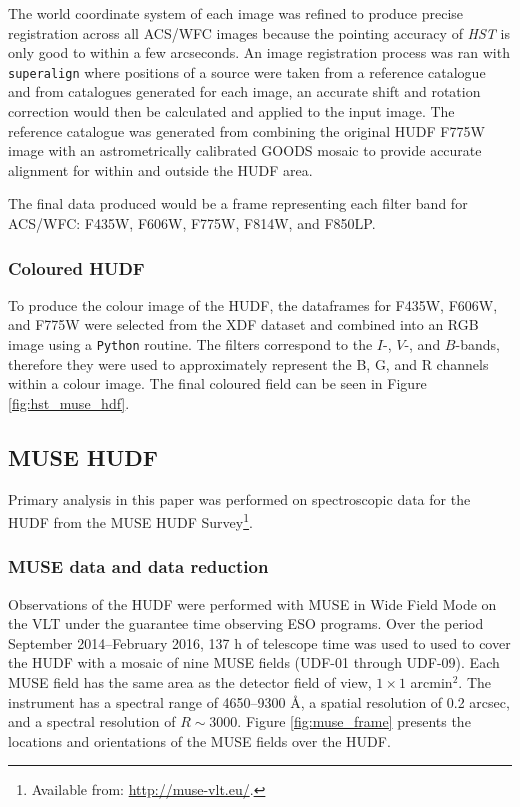 \documentclass[12pt, twocolumn, nofootinbib]{revtex4-1}    %
\begin{document}
The world coordinate system of each image was refined to produce precise registration across all ACS/WFC images because the pointing accuracy of \textit{HST} is only good to within a few arcseconds. An image registration process was ran with \texttt{superalign} \citep{2013ApJS..209....6I} where positions of a source were taken from a reference catalogue and from catalogues generated for each image, an accurate shift and rotation correction would then be calculated and applied to the input image. The reference catalogue was generated from combining the original HUDF F775W image with an astrometrically calibrated GOODS mosaic to provide accurate alignment for within and outside the HUDF area.

The final data produced would be a frame representing each filter band for ACS/WFC: F435W, F606W, F775W, F814W, and F850LP.

\vspace{2ex} %
\subsubsection{Coloured HUDF}
\noindent
To produce the colour image of the HUDF, the dataframes for F435W, F606W, and F775W were selected from the XDF dataset and combined into an RGB image using a \texttt{Python} routine. The filters correspond to the $I$-, $V$-, and $B$-bands, therefore they were used to approximately represent the B, G, and R channels within a colour image. The final coloured field can be seen in Figure \ref{fig:hst_muse_hdf}.

\vspace{2ex} %
\subsection{MUSE HUDF} \label{sec:obs_muse}
\noindent
Primary analysis in this paper was performed on spectroscopic data for the HUDF from the MUSE HUDF Survey\footnote{Available from: \href{http://muse-vlt.eu/}{http://muse-vlt.eu/}.}.

\vspace{2ex} %
\subsubsection{MUSE data and data reduction}
\noindent
Observations of the HUDF were performed with MUSE in Wide Field Mode on the VLT under the guarantee time observing ESO programs. Over the period September 2014--February 2016, 137 h of telescope time was used to used to cover the HUDF with a mosaic of nine MUSE fields (UDF-01 through UDF-09). Each MUSE field has the same area as the detector field of view, $1\times1$ arcmin$^2$. The instrument has a spectral range of 4650--9300 {\AA}, a spatial resolution of 0.2 arcsec, and a spectral resolution of $R\sim3000$. Figure \ref{fig:muse_frame} presents the locations and orientations of the MUSE fields over the HUDF.
\end{document}
